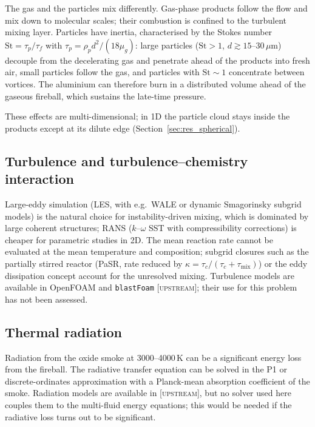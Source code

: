 \documentclass{article}
\newcommand{\up}{\textsc{[upstream]}}
\begin{document}
The gas and the particles mix differently. Gas-phase products follow the flow and mix down to molecular scales; their combustion is confined to the turbulent mixing layer. Particles have inertia, characterised by the Stokes number $\text{St} = \tau_p/\tau_f$ with $\tau_p = \rho_p d^2/(18\mu_g)$: large particles ($\text{St} > 1$, $d \gtrsim 15$--$30\,\mu\text{m}$) decouple from the decelerating gas and penetrate ahead of the products into fresh air, small particles follow the gas, and particles with $\text{St} \sim 1$ concentrate between vortices. The aluminium can therefore burn in a distributed volume ahead of the gaseous fireball, which sustains the late-time pressure.

These effects are multi-dimensional; in 1D the particle cloud stays inside the products except at its dilute edge (Section~\ref{sec:res_spherical}).

\subsection{Turbulence and turbulence--chemistry interaction}

Large-eddy simulation (LES, with e.g.\ WALE or dynamic Smagorinsky subgrid models) is the natural choice for instability-driven mixing, which is dominated by large coherent structures; RANS ($k$--$\omega$ SST with compressibility corrections) is cheaper for parametric studies in 2D. The mean reaction rate cannot be evaluated at the mean temperature and composition; subgrid closures such as the partially stirred reactor (PaSR, rate reduced by $\kappa = \tau_c/(\tau_c + \tau_\text{mix})$) or the eddy dissipation concept account for the unresolved mixing. Turbulence models are available in OpenFOAM and \texttt{blastFoam} \up; their use for this problem has not been assessed.

\subsection{Thermal radiation}
\label{sec:radiation}

Radiation from the oxide smoke at 3000--4000\,K can be a significant energy loss from the fireball. The radiative transfer equation can be solved in the P1 or discrete-ordinates approximation with a Planck-mean absorption coefficient of the smoke. Radiation models are available in  \up, but no solver used here couples them to the multi-fluid energy equations; this would be needed if the radiative loss turns out to be significant.
\end{document}

